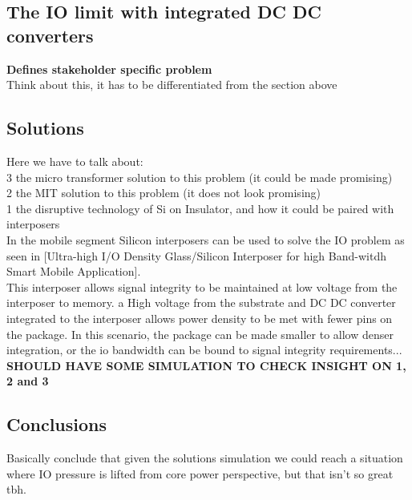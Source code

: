 \documentclass[letterpaper,twocolumn,10pt]{article}
\begin{document}
\subsection{The IO limit with integrated DC DC converters}

\textbf{Defines stakeholder specific problem}\\
Think about this, it has to be differentiated from the section above

\subsection{Solutions}

Here we have to talk about:\\
3 the micro transformer solution to this problem (it could be made promising) \\
2 the MIT solution to this problem (it does not look promising)\\
1 the disruptive technology of Si on Insulator, and how it could be paired with interposers\\
In the mobile segment Silicon interposers can be used to solve the IO problem as seen in [Ultra-high I/O Density Glass/Silicon Interposer for high Band-witdh Smart Mobile Application].\\
This interposer allows signal integrity to be maintained at low voltage from the interposer to memory. a High voltage from the substrate and DC DC converter integrated to the interposer allows power density to be met with fewer pins on the package. In this scenario, the package can be made smaller to allow denser integration, or the io bandwidth  can be bound to signal integrity requirements...\\


\textbf{SHOULD HAVE SOME SIMULATION TO CHECK INSIGHT ON 1, 2 and 3}\\

\subsection{Conclusions}

Basically conclude that given the solutions simulation we could reach a situation where IO pressure is lifted from core power perspective, but that isn't so great tbh. 
  


{\footnotesize 
}


\theendnotes
\end{document}
